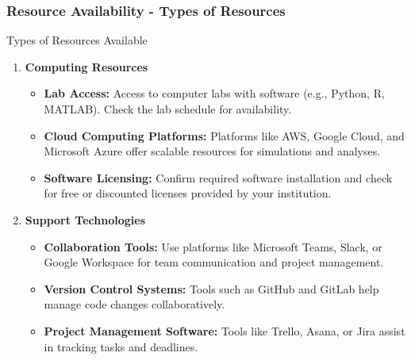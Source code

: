 \documentclass[aspectratio=169]{beamer}
\begin{document}
\begin{frame}[fragile]
    \frametitle{Resource Availability - Types of Resources}
    \begin{block}{Types of Resources Available}
        \begin{enumerate}
            \item \textbf{Computing Resources}
                \begin{itemize}
                    \item \textbf{Lab Access:} Access to computer labs with software (e.g., Python, R, MATLAB). Check the lab schedule for availability.
                    \item \textbf{Cloud Computing Platforms:} Platforms like AWS, Google Cloud, and Microsoft Azure offer scalable resources for simulations and analyses.
                    \item \textbf{Software Licensing:} Confirm required software installation and check for free or discounted licenses provided by your institution.
                \end{itemize}
                
            \item \textbf{Support Technologies}
                \begin{itemize}
                    \item \textbf{Collaboration Tools:} Use platforms like Microsoft Teams, Slack, or Google Workspace for team communication and project management.
                    \item \textbf{Version Control Systems:} Tools such as GitHub and GitLab help manage code changes collaboratively.
                    \item \textbf{Project Management Software:} Tools like Trello, Asana, or Jira assist in tracking tasks and deadlines.
                \end{itemize}
        \end{enumerate}
    \end{block}
\end{frame}
\end{document}
